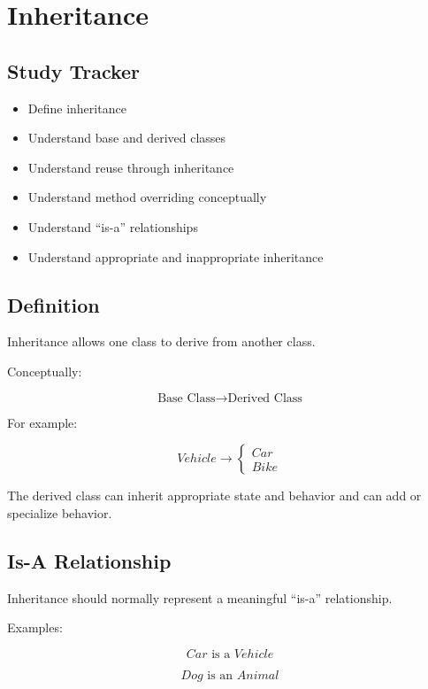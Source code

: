 \documentclass[11pt,a4paper]{article}
\newcommand{\checkitem}{$\square$}
\begin{document}
\section{Inheritance}

\subsection{Study Tracker}

\begin{itemize}[label=\checkitem]
    \item Define inheritance
    \item Understand base and derived classes
    \item Understand reuse through inheritance
    \item Understand method overriding conceptually
    \item Understand ``is-a'' relationships
    \item Understand appropriate and inappropriate inheritance
\end{itemize}

\subsection{Definition}

Inheritance allows one class to derive from another class.

Conceptually:

\[
\text{Base Class} \rightarrow \text{Derived Class}
\]

For example:

\[
Vehicle
\rightarrow
\begin{cases}
Car\\
Bike
\end{cases}
\]

The derived class can inherit appropriate state and behavior and can add or
specialize behavior.

\subsection{Is-A Relationship}

Inheritance should normally represent a meaningful ``is-a'' relationship.

Examples:

\[
Car \text{ is a } Vehicle
\]

\[
Dog \text{ is an } Animal
\]
\end{document}
